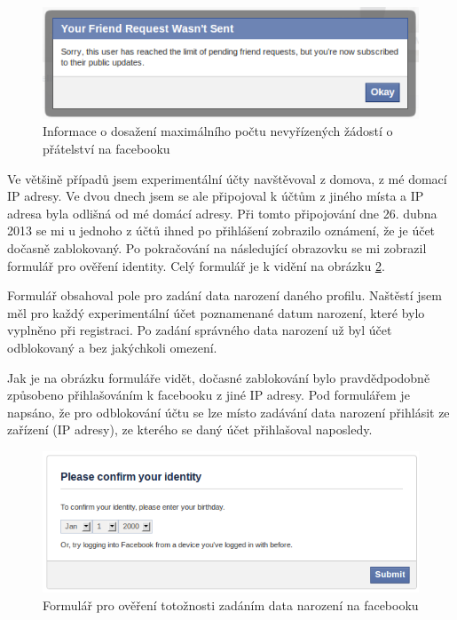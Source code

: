 \documentclass[thesis=M,czech]{FITthesis}[2013/05/10]
\begin{document}
\begin{figure}[h]
\begin{center}
\includegraphics[width=5in]{figures/friendRequestsLimitReached.png}
\caption{Informace o dosažení maximálního počtu nevyřízených žádostí o přátelství na facebooku}
\label{fig:friendRequestsLimitReached}
\end{center}
\end{figure}

Ve většině případů jsem experimentální účty navštěvoval z domova, z mé domací IP adresy. Ve dvou dnech jsem se ale připojoval k účtům z jiného místa a IP adresa byla odlišná od mé domácí adresy. Při tomto připojování dne 26. dubna 2013 se mi u jednoho z účtů ihned po přihlášení zobrazilo oznámení, že je účet dočasně zablokovaný. Po pokračování na následující obrazovku se mi zobrazil formulář pro ověření identity. Celý formulář je k vidění na obrázku \ref{fig:confirmIdentity}.

Formulář obsahoval pole pro zadání data narození daného profilu. Naštěstí jsem měl pro každý experimentální účet poznamenané datum narození, které bylo vyplněno při registraci. Po zadání správného data narození už byl účet odblokovaný a bez jakýchkoli omezení. 

Jak je na obrázku formuláře vidět, dočasné zablokování bylo pravdědpodobně způsobeno přihlašováním k facebooku z jiné IP adresy. Pod formulářem je napsáno, že pro odblokování účtu se lze místo zadávání data narození přihlásit ze zařízení (IP adresy), ze kterého se daný účet přihlašoval naposledy.

\begin{figure}[h]
\begin{center}
\includegraphics[width=5in]{figures/confirmIdentity.png}
\caption{Formulář pro ověření totožnosti zadáním data narození na facebooku}
\label{fig:confirmIdentity}
\end{center}
\end{figure}
\end{document}
